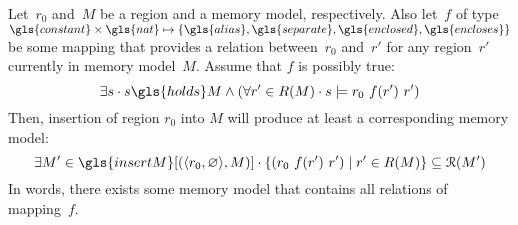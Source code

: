 \begin{lemma}\label{lem:insert}
  Let~$r_0$ and~$M$ be a region and a memory model, respectively.
  Also let~$f$ of type $\gls{constant}\times\gls{nat}\mapsto \{ \gls{alias},  \gls{separate}, \gls{enclosed},\gls{encloses}\}$ be some mapping that provides a relation between~$r_0$ and~$r'$ for any region~$r'$ currently in memory model~$M$.
  Assume that $f$ is possibly true:
  \begin{equation*}
    \exists s \sepdot s \gls{holds}M \wedge (\forall r' \in R(M) \sepdot s \models r_0~f(r')~r')
  \end{equation*}
  Then, insertion of region $r_0$ into $M$ will produce at least a corresponding memory model:
  \begin{equation*}
    \exists M' \in \gls{insertM}[(\langle r_0,\varnothing\rangle,M)] \sepdot \{ (r_0~f(r')~r') \mid r' \in R(M) \} \subseteq \mathcal{R}(M')
  \end{equation*}
  In words, there exists some memory model that contains all relations of mapping~$f$.
\end{lemma}
